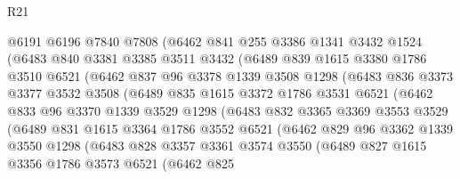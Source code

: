 \begin{lexlean}{R21}
\begin{coremodule}
            @6191
            @6196
            @7840
            @7808
            (@6462
              @841
              @255
              @3386
              @1341
              @3432
              @1524
              (@6483
                @840
                @3381
                @3385
                @3511
                @3432
                (@6489
                  @839
                  @1615
                  @3380
                  @1786
                  @3510
                  @6521
                  (@6462
                    @837
                    @96
                    @3378
                    @1339
                    @3508
                    @1298
                    (@6483
                      @836
                      @3373
                      @3377
                      @3532
                      @3508
                      (@6489
                        @835
                        @1615
                        @3372
                        @1786
                        @3531
                        @6521
                        (@6462
                          @833
                          @96
                          @3370
                          @1339
                          @3529
                          @1298
                          (@6483
                            @832
                            @3365
                            @3369
                            @3553
                            @3529
                            (@6489
                              @831
                              @1615
                              @3364
                              @1786
                              @3552
                              @6521
                              (@6462
                                @829
                                @96
                                @3362
                                @1339
                                @3550
                                @1298
                                (@6483
                                  @828
                                  @3357
                                  @3361
                                  @3574
                                  @3550
                                  (@6489
                                    @827
                                    @1615
                                    @3356
                                    @1786
                                    @3573
                                    @6521
                                    (@6462
                                      @825

\end{coremodule}
\end{lexlean}
